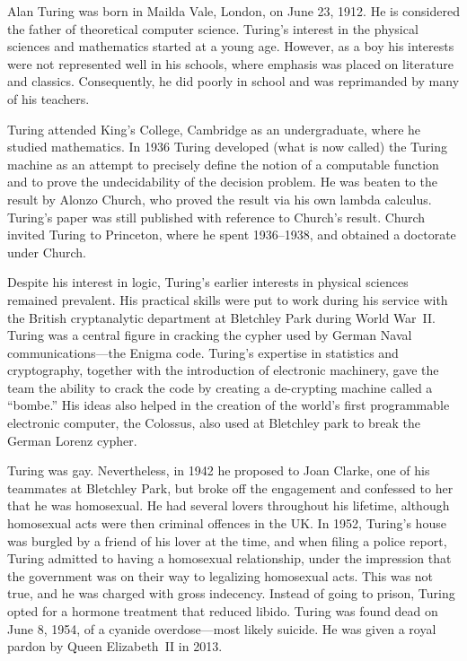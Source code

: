 \documentclass[../../../include/open-logic-section]{subfiles}
\begin{document}



Alan Turing was born in Mailda Vale, London, on June 23, 1912. He is
considered the father of theoretical computer science. Turing's
interest in the physical sciences and mathematics started at a young
age. However, as a boy his interests were not represented well in his
schools, where emphasis was placed on literature and
classics. Consequently, he did poorly in school and was reprimanded by
many of his teachers.

Turing attended King's College, Cambridge as an undergraduate, where
he studied mathematics. In 1936 Turing developed (what is now called)
the Turing machine as an attempt to precisely define the notion of a
computable function and to prove the undecidability of the decision
problem. He was beaten to the result by Alonzo Church, who proved the
result via his own lambda calculus. Turing's paper was still published
with reference to Church's result. Church invited Turing to Princeton,
where he spent 1936--1938, and obtained a doctorate under Church.

Despite his interest in logic, Turing's earlier interests in physical
sciences remained prevalent. His practical skills were put to work
during his service with the British cryptanalytic department at
Bletchley Park during World War~II. Turing was a central figure in
cracking the cypher used by German Naval communications---the Enigma
code.  Turing's expertise in statistics and cryptography, together
with the introduction of electronic machinery, gave the team the
ability to crack the code by creating a de-crypting machine called a
``bombe.'' His ideas also helped in the creation of the world's first
programmable electronic computer, the Colossus, also used at Bletchley
park to break the German Lorenz cypher.

Turing was gay. Nevertheless, in 1942 he proposed to Joan Clarke, one
of his teammates at Bletchley Park, but broke off the engagement and
confessed to her that he was homosexual. He had several lovers
throughout his lifetime, although homosexual acts were then criminal
offences in the UK. In 1952, Turing's house was burgled by a friend of
his lover at the time, and when filing a police report, Turing
admitted to having a homosexual relationship, under the impression
that the government was on their way to legalizing homosexual
acts. This was not true, and he was charged with gross
indecency. Instead of going to prison, Turing opted for a hormone
treatment that reduced libido.  Turing was found dead on June 8, 1954,
of a cyanide overdose---most likely suicide. He was given a royal
pardon by Queen Elizabeth~II in 2013.
\end{document}
